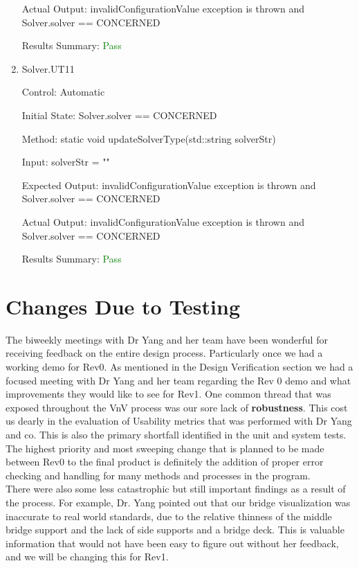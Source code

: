 \documentclass[12pt, titlepage]{article}
\begin{document}
\begin{enumerate}
    Actual Output: invalidConfigurationValue exception is thrown and Solver.solver == CONCERNED

    Results Summary: \textcolor{green} {Pass}

    \item{Solver.UT11\\}
    
    Control: Automatic

    Initial State: Solver.solver == CONCERNED
    
    Method: static void updateSolverType(std::string solverStr)
    
    Input: solverStr = ""
    
    Expected Output: invalidConfigurationValue exception is thrown and Solver.solver == CONCERNED

    Actual Output: invalidConfigurationValue exception is thrown and Solver.solver == CONCERNED

    Results Summary: \textcolor{green} {Pass}

\end{enumerate}

    
\section{Changes Due to Testing}

The biweekly meetings with Dr Yang and her team have been wonderful for receiving feedback on the entire design process. Particularly once we had a working demo for Rev0.
As mentioned in the Design Verification section we had a focused meeting with Dr Yang and her team regarding the Rev 0 demo and what improvements they would like to see for
Rev1. One common thread that was exposed throughout the VnV process was our sore lack of \textbf{robustness}. This cost us dearly in the evaluation of Usability metrics that
was performed with Dr Yang and co. This is also the primary shortfall identified in the unit and system tests. The highest priority and most sweeping change 
that is planned to be made between Rev0 to the final product is definitely the addition of proper error checking and handling for many methods and processes in the program.\\

There were also some less catastrophic but still important findings as a result of the process. For example, Dr. Yang pointed out that our bridge visualization was inaccurate to real world
standards, due to the relative thinness of the middle bridge support and the lack of side supports and a bridge deck. This is valuable information that would not have been
easy to figure out without her feedback, and we will be changing this for Rev1.\\
\end{document}
